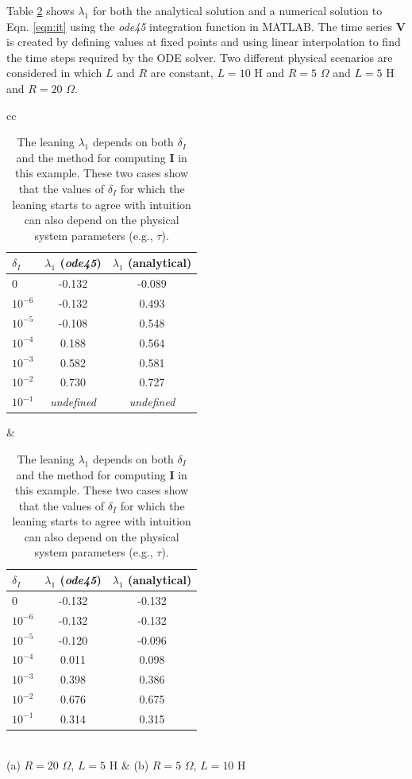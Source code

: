 \documentclass[twocolumn,aps,pre,groupedaddress]{revtex4-1}
\begin{document}
Table \ref{tab:rl} shows $\lambda_1$ for both the analytical solution and a numerical solution to Eqn. \ref{eqn:it} using the {\em ode45} integration function in MATLAB.  The time series $\mathbf{V}$ is created by defining values at fixed points and using linear interpolation to find the time steps required by the ODE solver.  Two different physical scenarios are considered in which $L$ and $R$ are constant, $L=10$ H and $R=5$ $\Omega$ and $L=5$ H and $R=20$ $\Omega$.  
\begin{table}
\begin{tabular}{cc}
\begin{tabular}{lcc}
$\delta_I$ & $\lambda_1$ ({\em ode45}) & $\lambda_1$ (analytical)\\
\hline
0 & -0.132 & -0.089 \\
$10^{-6}$ & -0.132 & 0.493 \\
$10^{-5}$ & -0.108 & 0.548 \\
$10^{-4}$ & 0.188 & 0.564 \\
$10^{-3}$ & 0.582 & 0.581 \\ 
$10^{-2}$ & 0.730 & 0.727 \\
$10^{-1}$ & {\em undefined} & {\em undefined}\\
\end{tabular} &
\begin{tabular}{lcc}
$\delta_I$ & $\lambda_1$ ({\em ode45}) & $\lambda_1$ (analytical)\\
\hline
0 & -0.132 & -0.132 \\
$10^{-6}$ & -0.132 & -0.132 \\
$10^{-5}$ & -0.120 & -0.096 \\
$10^{-4}$ & 0.011 & 0.098 \\
$10^{-3}$ & 0.398 & 0.386 \\
$10^{-2}$ & 0.676 & 0.675 \\
$10^{-1}$ & 0.314 & 0.315 \\
\end{tabular} \\
(a) $R = 20$ $\Omega$, $L = 5$ H & (b) $R = 5$ $\Omega$, $L = 10$ H\\
\end{tabular}
\caption{The leaning $\lambda_1$ depends on both $\delta_I$ and the method for computing $\mathbf{I}$ in this example.  These two cases show that the values of $\delta_I$ for which the leaning starts to agree with intuition can also depend on the physical system parameters (e.g., $\tau$).}
\label{tab:rl}
\end{table}
\end{document}
